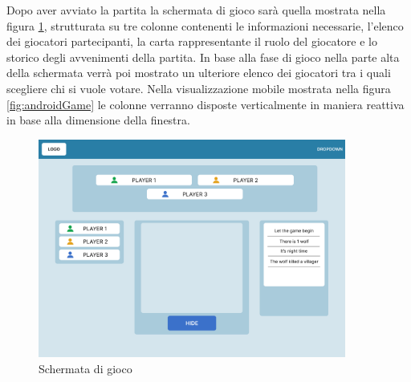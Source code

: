 \newpage

Dopo aver avviato la partita la schermata di gioco sarà quella mostrata nella figura \ref{fig:pcGame}, strutturata su tre colonne contenenti le informazioni necessarie, l'elenco dei giocatori partecipanti, la carta rappresentante il ruolo del giocatore e lo storico degli avvenimenti della partita. In base alla fase di gioco nella parte alta della schermata verrà poi mostrato un ulteriore elenco dei giocatori tra i quali scegliere chi si vuole votare. Nella visualizzazione mobile mostrata nella figura \ref{fig:androidGame} le colonne verranno disposte verticalmente in maniera reattiva in base alla dimensione della finestra.

\begin{figure}[H]
\centering
\includegraphics[width=0.9\textwidth]{img/figma/Wireframe-4.png}
\caption{Schermata di gioco}
\label{fig:pcGame}
\end{figure}


